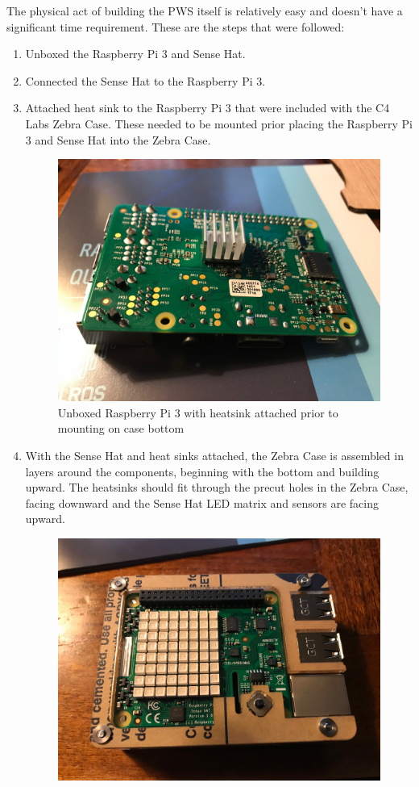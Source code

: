 \documentclass[sigconf]{acmart}
\begin{document}
The physical act of building the PWS itself is relatively easy and doesn't have a significant time requirement. These are the steps that were followed:
\begin{enumerate}
\item Unboxed the Raspberry Pi 3 and Sense Hat.
\item Connected the Sense Hat to the Raspberry Pi 3.
\item Attached heat sink to the Raspberry Pi 3 that were included with the C4 Labs Zebra Case. These needed to be mounted prior placing the Raspberry Pi 3 and Sense Hat into the Zebra Case.
\begin{figure}[H]
    \centering
    \includegraphics[scale=.10]{RASP3_1.jpg}
    \caption{Unboxed Raspberry Pi 3 with heatsink attached prior to mounting on case bottom}
\end{figure}
\item With the Sense Hat and heat sinks attached, the Zebra Case is assembled in layers around the components, beginning with the bottom and building upward. The heatsinks should fit through the precut holes in the Zebra Case, facing downward and the Sense Hat LED matrix and sensors are facing upward.
\begin{figure}[H]
    \centering
    \includegraphics[scale=.10]{SENSE_Case1.jpg}

\end{figure}
\end{enumerate}
\end{document}
